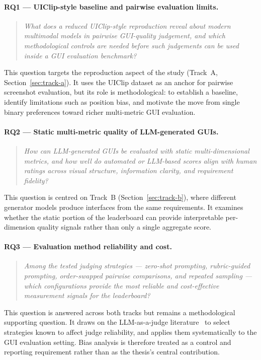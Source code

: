\paragraph{RQ1 — UIClip-style baseline and pairwise evaluation limits.}
\begin{quote}
\textit{What does a reduced UIClip-style reproduction reveal about
modern multimodal models in pairwise GUI-quality judgement, and which
methodological controls are needed before such judgements can be used
inside a GUI evaluation benchmark?}
\end{quote}
This question targets the reproduction aspect of the study
(Track~A, Section~\ref{sec:track-a}).
It uses the UIClip dataset as an anchor for pairwise screenshot
evaluation, but its role is methodological: to establish a baseline,
identify limitations such as position bias, and motivate the move from
single binary preferences toward richer multi-metric GUI evaluation.

\paragraph{RQ2 — Static multi-metric quality of LLM-generated GUIs.}
\begin{quote}
\textit{How can LLM-generated GUIs be evaluated with static
multi-dimensional metrics, and how well do automated or LLM-based scores
align with human ratings across visual structure, information clarity,
and requirement fidelity?}
\end{quote}
This question is centred on Track~B (Section~\ref{sec:track-b}), where
different generator models produce interfaces from the same requirements.
It examines whether the static portion of the leaderboard can provide
interpretable per-dimension quality signals rather than only a single
aggregate score.

\paragraph{RQ3 — Evaluation method reliability and cost.}
\begin{quote}
\textit{Among the tested judging strategies — zero-shot prompting,
rubric-guided prompting, order-swapped pairwise comparisons, and
repeated sampling — which configurations provide the most reliable and
cost-effective measurement signals for the leaderboard?}
\end{quote}
This question is answered across both tracks but remains a methodological
supporting question.
It draws on the LLM-as-a-judge literature~\cite{llm_judge,
li-etal-2025-generation,shi-etal-2025-judging} to select strategies
known to affect judge reliability, and applies them systematically
to the GUI evaluation setting. Bias analysis is therefore treated as a
control and reporting requirement rather than as the thesis's central
contribution.

